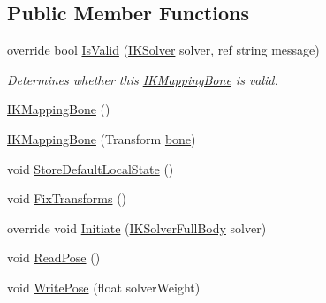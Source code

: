 \subsection*{Public Member Functions}
\begin{DoxyCompactItemize}
\item 
override bool \mbox{\hyperlink{class_root_motion_1_1_final_i_k_1_1_i_k_mapping_bone_ae6cdd8926b914a52dcef66e131733bd3}{Is\+Valid}} (\mbox{\hyperlink{class_root_motion_1_1_final_i_k_1_1_i_k_solver}{I\+K\+Solver}} solver, ref string message)
\begin{DoxyCompactList}\small\item\em Determines whether this \mbox{\hyperlink{class_root_motion_1_1_final_i_k_1_1_i_k_mapping_bone}{I\+K\+Mapping\+Bone}} is valid. \end{DoxyCompactList}\item 
\mbox{\hyperlink{class_root_motion_1_1_final_i_k_1_1_i_k_mapping_bone_af37ad89a40c913273dbda0cedfa13564}{I\+K\+Mapping\+Bone}} ()
\item 
\mbox{\hyperlink{class_root_motion_1_1_final_i_k_1_1_i_k_mapping_bone_a4b9e8c52109aebd7b49138131dbe70e1}{I\+K\+Mapping\+Bone}} (Transform \mbox{\hyperlink{class_root_motion_1_1_final_i_k_1_1_i_k_mapping_bone_a9d9f697b00a63ce7c5e5680d97cf8b5f}{bone}})
\item 
void \mbox{\hyperlink{class_root_motion_1_1_final_i_k_1_1_i_k_mapping_bone_aa8ef31cdff87a68f606a2c64a29ef2ef}{Store\+Default\+Local\+State}} ()
\item 
void \mbox{\hyperlink{class_root_motion_1_1_final_i_k_1_1_i_k_mapping_bone_ae14b0c6333c40c71009b791c84695620}{Fix\+Transforms}} ()
\item 
override void \mbox{\hyperlink{class_root_motion_1_1_final_i_k_1_1_i_k_mapping_bone_a7eea7aefe2699d7b01ebafe17543c6bd}{Initiate}} (\mbox{\hyperlink{class_root_motion_1_1_final_i_k_1_1_i_k_solver_full_body}{I\+K\+Solver\+Full\+Body}} solver)
\item 
void \mbox{\hyperlink{class_root_motion_1_1_final_i_k_1_1_i_k_mapping_bone_a538b21a94c446a812a001503cc0e20be}{Read\+Pose}} ()
\item 
void \mbox{\hyperlink{class_root_motion_1_1_final_i_k_1_1_i_k_mapping_bone_ae4255d613a7c727e017fe21c55eb021f}{Write\+Pose}} (float solver\+Weight)
\end{DoxyCompactItemize}
